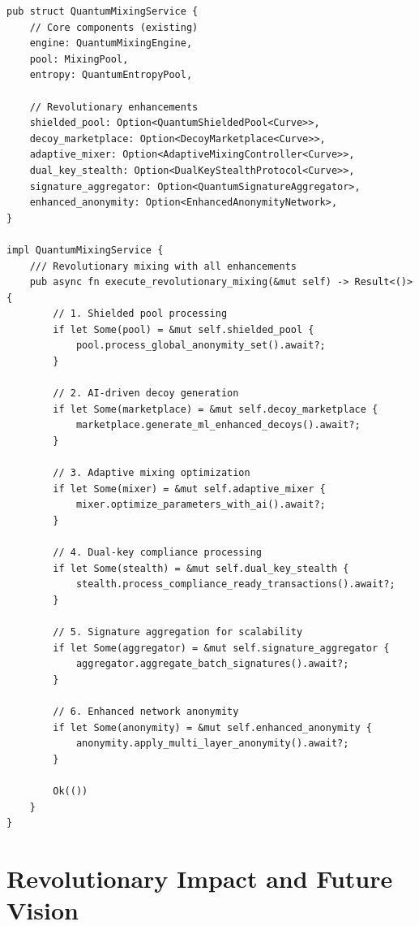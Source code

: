 \documentclass[12pt,a4paper]{article}
\begin{document}
\begin{lstlisting}[style=rustcode, caption=Revolutionary Integration]
pub struct QuantumMixingService {
    // Core components (existing)
    engine: QuantumMixingEngine,
    pool: MixingPool,
    entropy: QuantumEntropyPool,
    
    // Revolutionary enhancements
    shielded_pool: Option<QuantumShieldedPool<Curve>>,
    decoy_marketplace: Option<DecoyMarketplace<Curve>>,
    adaptive_mixer: Option<AdaptiveMixingController<Curve>>,
    dual_key_stealth: Option<DualKeyStealthProtocol<Curve>>,
    signature_aggregator: Option<QuantumSignatureAggregator>,
    enhanced_anonymity: Option<EnhancedAnonymityNetwork>,
}

impl QuantumMixingService {
    /// Revolutionary mixing with all enhancements
    pub async fn execute_revolutionary_mixing(&mut self) -> Result<()> {
        // 1. Shielded pool processing
        if let Some(pool) = &mut self.shielded_pool {
            pool.process_global_anonymity_set().await?;
        }
        
        // 2. AI-driven decoy generation
        if let Some(marketplace) = &mut self.decoy_marketplace {
            marketplace.generate_ml_enhanced_decoys().await?;
        }
        
        // 3. Adaptive mixing optimization
        if let Some(mixer) = &mut self.adaptive_mixer {
            mixer.optimize_parameters_with_ai().await?;
        }
        
        // 4. Dual-key compliance processing
        if let Some(stealth) = &mut self.dual_key_stealth {
            stealth.process_compliance_ready_transactions().await?;
        }
        
        // 5. Signature aggregation for scalability
        if let Some(aggregator) = &mut self.signature_aggregator {
            aggregator.aggregate_batch_signatures().await?;
        }
        
        // 6. Enhanced network anonymity
        if let Some(anonymity) = &mut self.enhanced_anonymity {
            anonymity.apply_multi_layer_anonymity().await?;
        }
        
        Ok(())
    }
}
\end{lstlisting}

\section{Revolutionary Impact and Future Vision}
\end{document}
